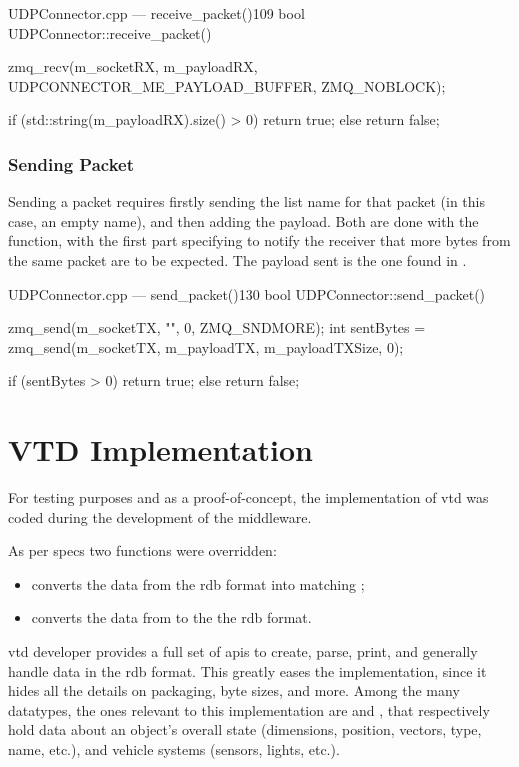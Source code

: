 \begin{codelist}{UDPConnector.cpp --- receive\_packet()}{109}
bool UDPConnector::receive_packet() {
	zmq_recv(m_socketRX, m_payloadRX, UDPCONNECTOR_ME_PAYLOAD_BUFFER, ZMQ_NOBLOCK);

	if (std::string(m_payloadRX).size() > 0)
		return true;
	else
		return false;
}
\end{codelist}

\subsubsection{Sending Packet}

Sending a \gls{packet} requires firstly sending the list name for that \gls{packet} (in this case, an empty name), and then adding the \gls{payload}. Both are done with the  function, with the first part specifying  to notify the receiver that more bytes from the same \gls{packet} are to be expected. The \gls{payload} sent is the one found in .

\begin{codelist}{UDPConnector.cpp --- send\_packet()}{130}
bool UDPConnector::send_packet() {
	zmq_send(m_socketTX, "", 0, ZMQ_SNDMORE);
	int sentBytes = zmq_send(m_socketTX, m_payloadTX, m_payloadTXSize, 0);

	if (sentBytes > 0)
		return true;
	else
		return false;
}
\end{codelist}

\section{VTD Implementation}\label{sc:middleware:implementation}

For testing purposes and as a proof-of-concept, the implementation of \gls{vtd} was coded during the development of the \gls{middleware}.

As per specs two functions were overridden:

\begin{itemize}
	\item {} converts the data from the \gls{rdb} format into matching ;
	\item {} converts the data from  to the the \gls{rdb} format.
\end{itemize}

\gls{vtd} developer  provides a full set of \glspl{api} to create, parse, print, and generally handle data in the \gls{rdb} format. This greatly eases the implementation, since it hides all the details on packaging, byte sizes, and more. Among the many datatypes, the ones relevant to this implementation are  and , that respectively hold data about an object's overall state (dimensions, position, vectors, type, name, etc.), and vehicle systems (sensors, lights, etc.).

